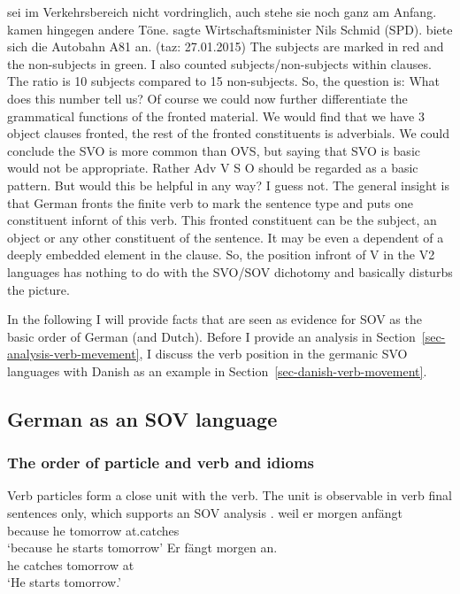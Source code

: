  sei im Verkehrsbereich nicht vordringlich, auch stehe sie noch ganz am
Anfang.  
kamen hingegen andere Töne.  sagte Wirtschaftsminister Nils Schmid (SPD).  biete sich die Autobahn A81 an. (taz: 27.01.2015)
\z
The subjects are marked in red and the non-subjects in green. I also counted subjects/non-subjects
within clauses. The ratio is 10 subjects compared to 15 non-subjects. So, the question is: What does
this number tell us? Of course we could now further differentiate the grammatical functions of the
fronted material. We would find that we have 3 object clauses fronted, the rest of the fronted
constituents is adverbials. We could conclude the SVO is more common than OVS, but saying that SVO
is basic would not be appropriate. Rather Adv V S O should be regarded as a basic pattern. But would
this be helpful in any way? I guess not. The general insight is that German fronts the finite verb
to mark the sentence type and puts one constituent infornt of this verb. This fronted constituent
can be the subject, an object or any other constituent of the sentence. It may be even a dependent
of a deeply embedded element in the clause. So, the position infront of V in the V2 languages has
nothing to do with the SVO/SOV dichotomy and basically disturbs the picture. 

In the following I will provide facts that are seen as evidence for SOV as the basic order of German
(and Dutch). Before I provide an analysis in Section~\ref{sec-analysis-verb-mevement}, I discuss the
verb position in the germanic SVO languages with Danish as an example in Section~\ref{sec-danish-verb-movement}.

\subsection{German as an SOV language}

\subsubsection{The order of particle and verb and idioms}

Verb particles form a close unit with the verb. The unit is observable in verb final sentences only,
which supports an SOV analysis \citep[]{Bierwisch63}. 
\eal
\ex 
\gll weil er morgen anfängt\\
     because he tomorrow at.catches\\
\glt `because he starts tomorrow'
\ex 
\gll Er fängt morgen an.\\
     he catches tomorrow at\\
\glt `He starts tomorrow.'
\zl

